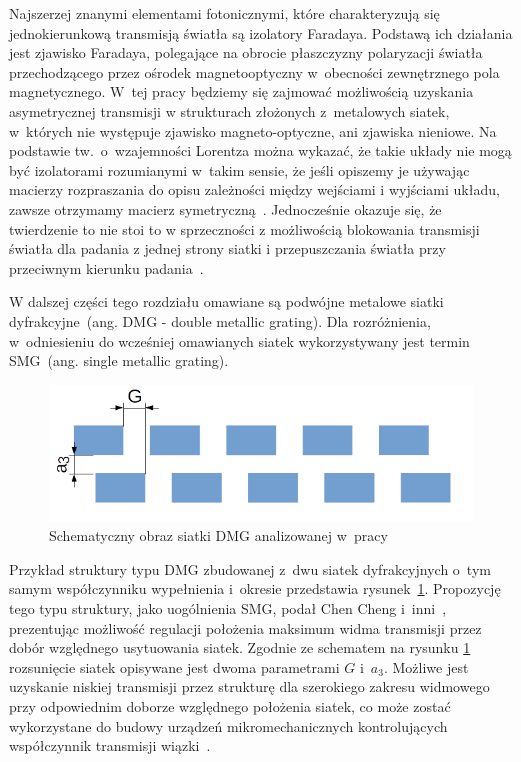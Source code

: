 Najszerzej znanymi elementami fotonicznymi, które charakteryzują się jednokierunkową transmisją światła są izolatory Faradaya.  Podstawą ich działania jest zjawisko Faradaya, polegające na obrocie płaszczyzny polaryzacji światła przechodzącego przez ośrodek magnetooptyczny w~obecności zewnętrznego pola magnetycznego. W~tej pracy będziemy się zajmować możliwością uzyskania asymetrycznej transmisji w strukturach złożonych z~metalowych siatek, w~których nie występuje zjawisko magneto-optyczne, ani zjawiska nieniowe. Na podstawie tw.~o~wzajemności Lorentza można wykazać, że takie układy nie mogą być izolatorami rozumianymi w~takim sensie, że jeśli opiszemy je używając macierzy rozpraszania do opisu zależności między wejściami i wyjściami układu, zawsze otrzymamy macierz symetryczną~\cite{4171512}. Jednocześnie okazuje się, że twierdzenie to nie stoi to w sprzeczności z możliwością blokowania transmisji światła dla padania z jednej strony siatki i przepuszczania światła przy przeciwnym kierunku padania~\cite{lockyear2006one}.

W dalszej części tego rozdziału omawiane są podwójne metalowe siatki dyfrakcyjne~(ang. DMG - double metallic grating). Dla rozróżnienia, w~odniesieniu do wcześniej omawianych siatek wykorzystywany jest termin SMG~(ang. single metallic grating).

\begin{figure}[tb]
	\includegraphics[width=\textwidth]{images/dmg/dmg_general_schem.png}
	\caption{Schematyczny obraz siatki DMG analizowanej w~pracy~\cite{cheng2007controllable}}
	\label{fig:cheng_dmg_schem}
\end{figure}

Przykład struktury typu DMG zbudowanej z~dwu siatek dyfrakcyjnych o~tym samym współczynniku wypełnienia i~okresie przedstawia rysunek~\ref{fig:cheng_dmg_schem}. Propozycję tego typu struktury, jako uogólnienia SMG, podał Chen Cheng i~inni~\cite{cheng2007controllable}, prezentując możliwość regulacji położenia maksimum widma transmisji przez dobór względnego usytuowania siatek. Zgodnie ze schematem na rysunku \ref{fig:cheng_dmg_schem} rozsunięcie siatek opisywane jest dwoma parametrami $G$ i~$a_3$. Możliwe jest uzyskanie niskiej transmisji przez strukturę dla szerokiego zakresu widmowego przy odpowiednim doborze względnego położenia siatek, co może zostać wykorzystane do budowy urządzeń mikromechanicznych kontrolujących współczynnik transmisji wiązki~\cite{cheng2007controllable}.

